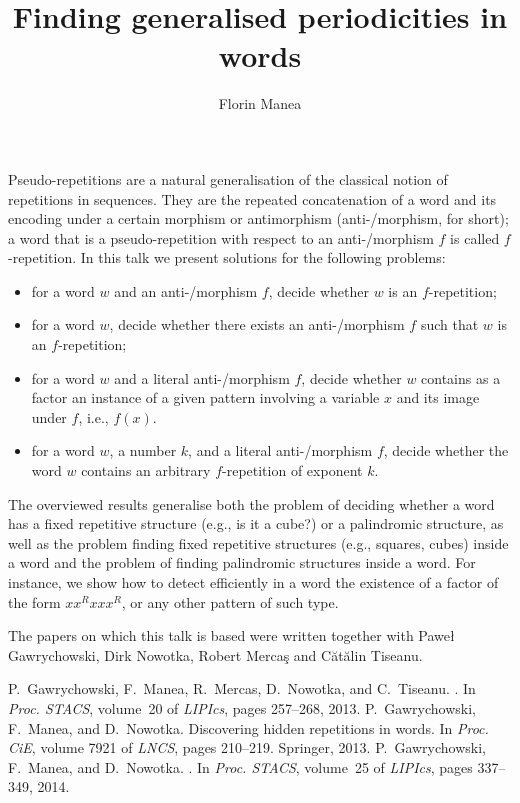 \documentclass{article}
\begin{document}
\title{Finding generalised periodicities in words}
\author{Florin Manea}
\date{}
\maketitle
\thispagestyle{empty}
Pseudo-repetitions are a natural generalisation of the classical notion of repetitions in sequences. They are the repeated concatenation of a word and its encoding under a certain morphism or antimorphism (anti-/morphism, for short); a word that is a pseudo-repetition with respect to an anti-/morphism $f$ is called $f$-repetition. In this talk we present solutions for the following problems:
\begin{itemize}
\item for a word $w$ and an anti-/morphism $f$, decide whether $w$ is an $f$-repetition;
\item for a word $w$, decide whether there exists an anti-/morphism $f$ such that $w$ is an $f$-repetition;
\item for a word $w$ and a literal anti-/morphism $f$, decide whether $w$ contains as a factor an instance of a given pattern involving a variable $x$ and its 
image under $f$, i.e., $f(x)$. 
\item for a word $w$, a number $k$, and a literal anti-/morphism $f$, decide whether the word $w$ contains an arbitrary $f$-repetition of exponent $k$.
\end{itemize}
The overviewed results generalise both the problem of deciding whether a word has a fixed repetitive structure (e.g., is it a cube?) or a palindromic structure, as well as the problem finding fixed repetitive structures 
(e.g., squares, cubes) inside a word and the problem of finding palindromic structures inside a word. For instance, we show how to detect efficiently in a word the existence of a factor of the form $xx^Rxxx^R$, or
any other pattern of such type.

The papers on which this talk is based were written together with Pawe\l{} Gawrychowski, Dirk Nowotka, Robert Merca\c{s} and C\u at\u alin Tiseanu.

\begin{thebibliography}{99}
P.~Gawrychowski, F.~Manea, R.~Mercas, D.~Nowotka, and C.~Tiseanu.
.
\newblock In {\em Proc. STACS}, volume~20 of {\em LIPIcs}, pages
  257--268, 2013.
P.~Gawrychowski, F.~Manea, and D.~Nowotka.
\newblock Discovering hidden repetitions in words.
\newblock In {\em Proc. CiE}, volume 7921 of {\em LNCS}, pages 210--219.
  Springer, 2013.
P.~Gawrychowski, F.~Manea, and D.~Nowotka.
.
\newblock In {\em Proc. STACS}, volume~25 of {\em LIPIcs}, pages
  337--349, 2014.
  
\end{thebibliography}
\end{document}
